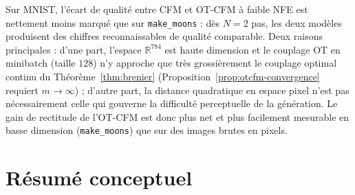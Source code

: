 \documentclass[11pt,a4paper]{article}
\theoremstyle{definition}
\theoremstyle{plain}
\theoremstyle{remark}
\newcommand{\R}{\mathbb{R}}
\begin{document}
\begin{warningbox}
Sur MNIST, l'écart de qualité entre CFM et OT-CFM à faible NFE est nettement moins marqué que sur
\texttt{make\_moons} : dès $N=2$ pas, les deux modèles produisent des chiffres reconnaissables de
qualité comparable. Deux raisons principales : d'une part, l'espace $\R^{784}$ est haute dimension
et le couplage OT en minibatch (taille $128$) n'y approche que très grossièrement le couplage
optimal continu du Théorème~\ref{thm:brenier} (Proposition~\ref{prop:otcfm-convergence} requiert
$m\to\infty$) ; d'autre part, la distance quadratique en espace pixel n'est pas nécessairement
celle qui gouverne la difficulté perceptuelle de la génération. Le gain de rectitude de l'OT-CFM
est donc plus net et plus facilement mesurable en basse dimension (\texttt{make\_moons}) que sur des
images brutes en pixels.
\end{warningbox}

\section{Résumé conceptuel}
\end{document}
